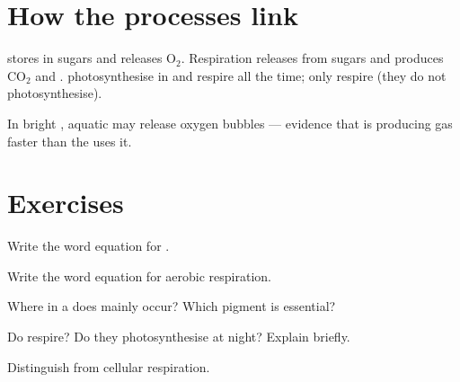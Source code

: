 \section{How the processes link}

\begin{proposition}\label{prop:g7:photo-resp:link}
 stores   in sugars and releases $\mathrm{O_2}$.
Respiration releases  from sugars and produces $\mathrm{CO_2}$ and
.  photosynthesise in  and respire all the time; 
only respire (they do not photosynthesise).
\end{proposition}
\admitted

\begin{example}\label{ex:g7:photo-resp:bubbles}
In bright , aquatic  may release oxygen bubbles --- evidence
that  is producing gas faster than the  uses it.
\end{example}

\section{Exercises}

\begin{exercise}[$\star$]\label{exo:g7:photo-resp:1}
Write the word equation for .
\end{exercise}

\begin{exercise}[$\star$]\label{exo:g7:photo-resp:2}
Write the word equation for aerobic respiration.
\end{exercise}

\begin{exercise}[$\star$]\label{exo:g7:photo-resp:3}
Where in a   does  mainly occur? Which pigment is
essential?
\end{exercise}

\begin{exercise}[$\star$]\label{exo:g7:photo-resp:4}
Do  respire? Do they photosynthesise at night? Explain briefly.
\end{exercise}

\begin{exercise}[$\star$]\label{exo:g7:photo-resp:5}
Distinguish  from cellular respiration.
\end{exercise}

